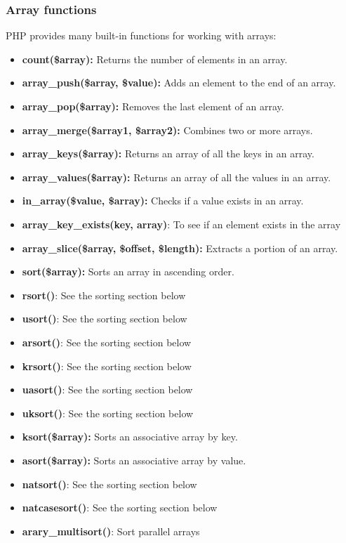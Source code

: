\documentclass{report}
\begin{document}
\subsubsection{Array functions}
\bigbreak \noindent 
PHP provides many built-in functions for working with arrays:
\begin{itemize}
    \item \textbf{count(\$array):} Returns the number of elements in an array.
    \item \textbf{array\_push(\$array, \$value):} Adds an element to the end of an array.
    \item \textbf{array\_pop(\$array):} Removes the last element of an array.
    \item \textbf{array\_merge(\$array1, \$array2):} Combines two or more arrays.
    \item \textbf{array\_keys(\$array):} Returns an array of all the keys in an array.
    \item \textbf{array\_values(\$array):} Returns an array of all the values in an array.
    \item \textbf{in\_array(\$value, \$array):} Checks if a value exists in an array.
    \item \textbf{array\_key\_exists(key, array)}: To see if an element exists in the array
    \item \textbf{array\_slice(\$array, \$offset, \$length):} Extracts a portion of an array.
    \item \textbf{sort(\$array):} Sorts an array in ascending order.
    \item \textbf{rsort()}: See the sorting section below
    \item \textbf{usort()}: See the sorting section below
    \item \textbf{arsort()}: See the sorting section below
    \item \textbf{krsort()}: See the sorting section below
    \item \textbf{uasort()}: See the sorting section below
    \item \textbf{uksort()}: See the sorting section below
    \item \textbf{ksort(\$array):} Sorts an associative array by key.
    \item \textbf{asort(\$array):} Sorts an associative array by value.
    \item \textbf{natsort()}: See the sorting section below
    \item \textbf{natcasesort()}: See the sorting section below
    \item \textbf{arary\_multisort()}: Sort parallel arrays

\end{itemize}
\end{document}
